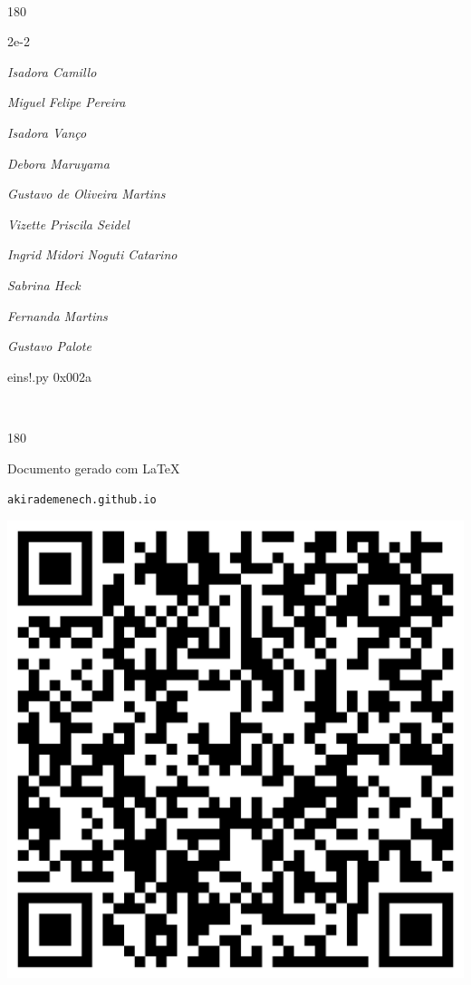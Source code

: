 \documentclass[12pt]{article}
\begin{document}
	\ 
	\vfill
	\begin{turn}{180}	
		\begin{minipage}{\textwidth}
		  	\ttfamily %
			\centering
			{\Huge 2e-2}
		  
			\hfill
		  
			

\textit{\small Isadora Camillo}

\textit{\small Miguel Felipe Pereira}

\textit{\small Isadora Vanço}

\textit{\small Debora Maruyama}

\textit{\small Gustavo de Oliveira Martins}

\textit{\small Vizette Priscila Seidel}

\textit{\small Ingrid Midori Noguti Catarino}

\textit{\small Sabrina Heck}

\textit{\small Fernanda Martins}

\textit{\small Gustavo Palote}

\bigskip

eins!.py
0x002a


		\end{minipage}	
	\end{turn}
	\vfill
	\

\pagebreak

	\begin{turn}{180}	
		\begin{minipage}{\textwidth}		  
		  Documento gerado com \LaTeX			
		  
		  \texttt{akirademenech.github.io}

		  \includegraphics[height=0.3\textheight]{2e-2.pdf}

		\end{minipage}	
	\end{turn}  
		  
\end{document}
